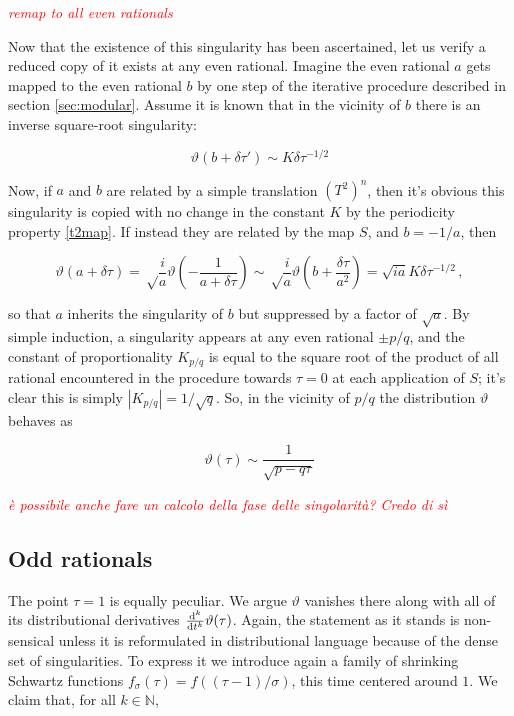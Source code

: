 \documentclass{article}
\newcommand{\cmnt}[1]{\textcolor{red}{\emph{#1}}}
\begin{document}
\cmnt{remap to all even rationals}

Now that the existence of this singularity has been ascertained, let us verify a reduced copy of it exists at any even rational. Imagine the even rational $a$ gets mapped to the even rational $b$ by one step of the iterative procedure described in section \ref{sec:modular}. Assume it is known that in the vicinity of $b$ there is an inverse square-root singularity:

\begin{equation}
    \vartheta(b + \delta\tau') \sim K \delta \tau^{-1/2}
\end{equation}

Now, if $a$ and $b$ are related by a simple translation $(T^2)^n$, then it's obvious this singularity is copied with no change in the constant $K$ by the periodicity property \eqref{t2map}. If instead they are related by the map $S$, and $b = -1/a$, then

\begin{equation}
    \vartheta(a + \delta\tau) = \sqrt\frac{i}{a} \vartheta\left(-\frac{1}{a+\delta\tau}\right) \sim \sqrt\frac{i}{a} \vartheta(b + \frac{\delta \tau}{a^2}) = \sqrt{ia} K \delta\tau^{-1/2}\,,
\end{equation}

so that $a$ inherits the singularity of $b$ but suppressed by a factor of $\sqrt{a}$. By simple induction, a singularity appears at any even rational $\pm p/q$, and the constant of proportionality $K_{p/q}$ is equal to the square root of the product of all rational encountered in the procedure towards $\tau = 0$ at each application of $S$; it's clear this is simply $|K_{p/q}| = 1/\sqrt{q}$. So, in the vicinity of $p/q$ the distribution $\vartheta$ behaves as

\begin{equation}
    \vartheta(\tau) \sim \frac{1}{\sqrt{p-q\tau}}
\end{equation}

\cmnt{è possibile anche fare un calcolo della fase delle singolarità? Credo di sì}

\subsection{Odd rationals}

The point $\tau=1$ is equally peculiar. We argue $\vartheta$ vanishes there along with all of its distributional derivatives $\dv[k]{t} \vartheta(\tau)$. Again, the statement as it stands is non-sensical unless it is reformulated in distributional language because of the dense set of singularities. To express it we introduce again a family of shrinking Schwartz functions $f_\sigma(\tau) = f((\tau-1)/\sigma)$, this time centered around $1$. We claim that, for all $k \in \mathbb{N}$,
\end{document}
